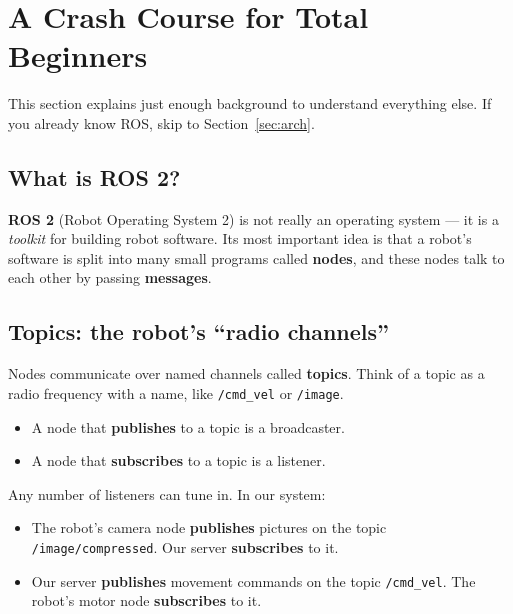 \documentclass[11pt,a4paper]{article}
\newcommand{\code}[1]{\texttt{#1}}
\begin{document}
\section{A Crash Course for Total Beginners}
This section explains just enough background to understand everything else.
If you already know ROS, skip to Section~\ref{sec:arch}.

\subsection{What is ROS 2?}
\textbf{ROS 2} (Robot Operating System 2) is not really an operating system ---
it is a \emph{toolkit} for building robot software. Its most important idea is
that a robot's software is split into many small programs called \textbf{nodes},
and these nodes talk to each other by passing \textbf{messages}.

\subsection{Topics: the robot's ``radio channels''}
Nodes communicate over named channels called \textbf{topics}. Think of a topic
as a radio frequency with a name, like \code{/cmd\_vel} or \code{/image}.
\begin{itemize}[noitemsep]
  \item A node that \textbf{publishes} to a topic is a broadcaster.
  \item A node that \textbf{subscribes} to a topic is a listener.
\end{itemize}
Any number of listeners can tune in. In our system:
\begin{itemize}[noitemsep]
  \item The robot's camera node \textbf{publishes} pictures on the topic
        \code{/image/compressed}. Our server \textbf{subscribes} to it.
  \item Our server \textbf{publishes} movement commands on the topic
        \code{/cmd\_vel}. The robot's motor node \textbf{subscribes} to it.
\end{itemize}
\end{document}
